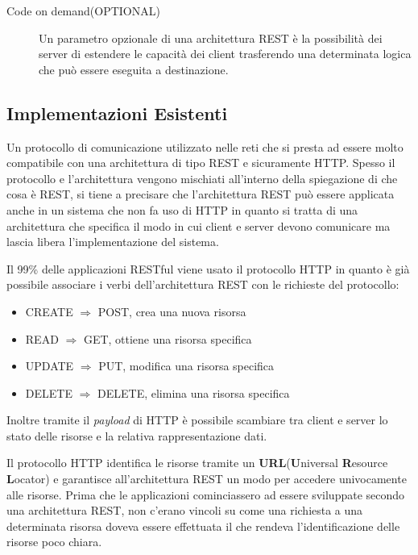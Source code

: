 \begin{description}
\item[Code on demand(OPTIONAL)]

Un parametro opzionale di una architettura REST è la possibilità dei server di estendere le capacità dei client trasferendo una determinata logica che può essere eseguita a destinazione.

\end{description}



\subsection{Implementazioni Esistenti}

Un protocollo di comunicazione utilizzato nelle reti che si presta ad essere molto compatibile con una architettura di tipo REST e sicuramente HTTP. Spesso il protocollo e l'architettura vengono mischiati all'interno della spiegazione di che cosa è REST, si tiene a precisare che l'architettura REST può essere applicata anche in un sistema che non fa uso di HTTP in quanto si tratta di una architettura che specifica il modo in cui client e server devono comunicare ma lascia libera l'implementazione del sistema.

Il 99\% delle applicazioni RESTful viene usato il protocollo HTTP in quanto è già possibile associare i verbi dell'architettura REST con le richieste del protocollo: 
\begin{itemize}
\item CREATE $\Rightarrow$ POST, crea una nuova risorsa

\item READ   $\Rightarrow$ GET, ottiene una risorsa specifica

\item UPDATE $\Rightarrow$ PUT, modifica una risorsa specifica

\item DELETE $\Rightarrow$ DELETE, elimina una risorsa specifica

\end{itemize}
Inoltre tramite il \emph{payload} di HTTP è possibile scambiare tra client e server lo stato delle risorse e la relativa rappresentazione dati.

Il protocollo HTTP identifica le risorse tramite un \textbf{URL}(\textbf{U}niversal \textbf{R}esource \textbf{L}ocator) e garantisce all'architettura REST un modo per accedere univocamente alle risorse.
Prima che le applicazioni cominciassero ad essere sviluppate secondo una architettura REST, non c'erano vincoli su come una richiesta a una determinata risorsa doveva essere effettuata il che rendeva l'identificazione delle risorse poco chiara.

